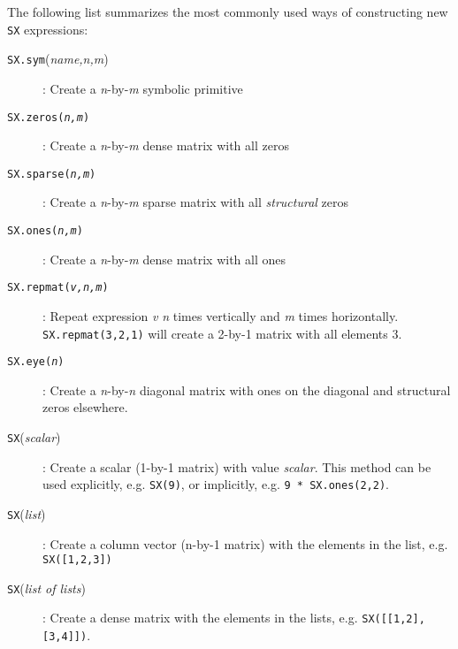 \documentclass[a4paper,12pt]{book}
\newcommand{\CasADi}{\texttt{CasADi}\xspace}
\newcounter{pytexcount}
\newcounter{pytexsubcount}
\renewenvironment{pytex}
{\addtocounter{pytexsubcount}{1}%
\begin{rawhtml}
<div style="color: black; background-color: \#b9c8db;  border-style: dotted; border-width: 1px; padding:2px;padding-left:1em" >
<pre>
\end{rawhtml}
}%
{\begin{rawhtml}
</pre>
</div>
<div style="color: black; background-color: \#fffff;  border-style: solid; border-width: 1px; padding:2px;padding-left:1em;margin-left:1em;" >\end{rawhtml}%
\verbatiminputeval{pytex_\alph{pytexcount}_\arabic{pytexsubcount}.log}%
\begin{rawhtml}
</div>
\end{rawhtml}
}
\begin{document}
The following list summarizes the most commonly used ways of constructing new \texttt{SX} expressions:
\begin{description}
  \item[\texttt{SX.sym}(\emph{name,n,m})]: Create a \emph{n}-by-\emph{m} symbolic primitive
  \item[\texttt{SX.zeros(\emph{n,m})}]: Create a \emph{n}-by-\emph{m} dense matrix with all zeros
  \item[\texttt{SX.sparse(\emph{n,m})}]: Create a \emph{n}-by-\emph{m} sparse matrix with all \emph{structural} zeros
  \item[\texttt{SX.ones(\emph{n,m})}]: Create a \emph{n}-by-\emph{m} dense matrix with all ones
  \item[\texttt{SX.repmat(\emph{v,n,m})}]: Repeat expression \emph{v} \emph{n} times vertically and \emph{m} times horizontally. \verb|SX.repmat(3,2,1)| will create a 2-by-1 matrix with all elements 3.
  \item[\texttt{SX.eye(\emph{n})}]: Create a \emph{n}-by-\emph{n} diagonal matrix with ones on the diagonal and structural zeros elsewhere.
  \item[\texttt{SX}(\emph{scalar})]: Create a scalar (1-by-1 matrix) with value \emph{scalar}. This method can be used explicitly, e.g. \verb|SX(9)|, or implicitly, e.g. \verb|9 * SX.ones(2,2)|.
  \item[\texttt{SX}(\emph{list})]: Create a column vector (n-by-1 matrix) with the elements in the list, e.g. \verb|SX([1,2,3])|
  \item[\texttt{SX}(\emph{list of lists})]: Create a dense matrix with the elements in the lists, e.g. \verb|SX([[1,2],[3,4]])|.
\end{description}



\end{document}
